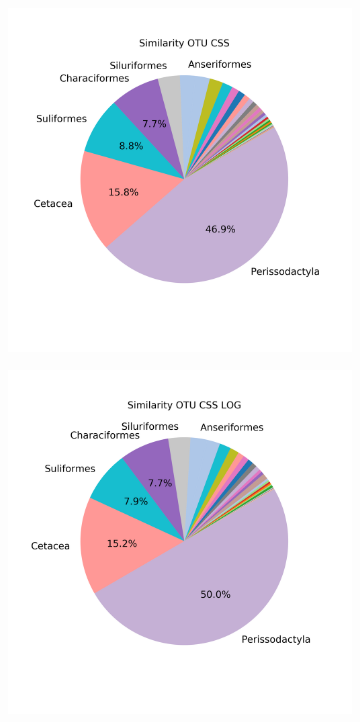 \begin{figure}[h]
\begin{subfigure}{0.45\textwidth}
		\caption{}
		\label{fig:dissimotucsslog}
	\end{subfigure}\\
		\begin{subfigure}{0.45\textwidth}
		\includegraphics[width=\textwidth]{rfr_dis_sum_pieOTU CSS}
		\caption{}
		\label{fig:dissimotucss}
	\end{subfigure}
	\begin{subfigure}{0.45\textwidth}
	\includegraphics[width=\textwidth]{rfr_dis_sum_pieOTU CSS LOG}
	\caption{}
	\label{fig:dissimotucsslog}
\end{subfigure}\\


\end{figure}
